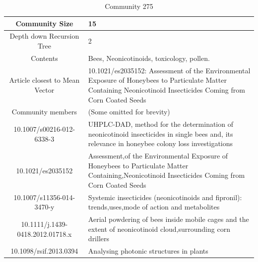 \begin{table}[H]
\centering
\caption{Community 275}
\label{tabl:com275}
\begin{tabular}{||c|p{10cm}||}
\hline
Community Size                   & 15                                                                                                                                                                 \\ \hline
Depth down Recursion Tree        & 2                                                                                                                                                                  \\ \hline
Contents                         & Bees, Neonicotinoids, toxicology, pollen.                                                                                                                          \\ \hline
Article closest to Mean Vector                      & 10.1021/es2035152: Assessment of the Environmental Exposure of Honeybees to Particulate Matter Containing Neonicotinoid Insecticides Coming from Corn Coated Seeds \\ \hline
Community members                & (Some omitted for brevity)                                                                                                                                         \\ \hline
10.1007/s00216-012-6338-3        & UHPLC-DAD, method for the determination of neonicotinoid insecticides in single bees and, its relevance in honeybee colony loss investigations                     \\ \hline
10.1021/es2035152                & Assessment,of the Environmental Exposure of Honeybees to Particulate Matter Containing,Neonicotinoid Insecticides Coming from Corn Coated Seeds                    \\ \hline
10.1007/s11356-014-3470-y        & Systemic insecticides (neonicotinoids and fipronil): trends,uses,mode of action and metabolites                                                                    \\ \hline
10.1111/j.1439-0418.2012.01718.x & Aerial powdering of bees inside mobile cages and the extent of neonicotinoid cloud,surrounding corn drillers                                                       \\ \hline
10.1098/rsif.2013.0394           & Analysing photonic structures in plants                                                                                                                            \\ \hline

\end{tabular}
\end{table}

